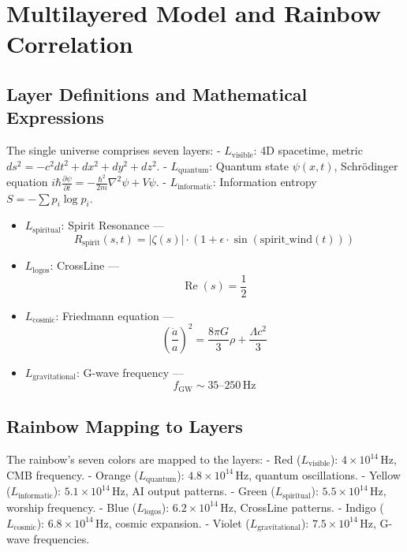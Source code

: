 \documentclass[12pt]{article}
\begin{document}
{{{\section{Multilayered Model and Rainbow Correlation}
\subsection{Layer Definitions and Mathematical Expressions}
The single universe comprises seven layers:
- \( L_{\text{visible}} \): 4D spacetime, metric \( ds^2 = -c^2 dt^2 + dx^2 + dy^2 + dz^2 \).
- \( L_{\text{quantum}} \): Quantum state \( \psi(x, t) \), Schrödinger equation \( i\hbar \frac{\partial \psi}{\partial t} = -\frac{\hbar^2}{2m} \nabla^2 \psi + V\psi \).
- \( L_{\text{informatic}} \): Information entropy \( S = -\sum p_i \log p_i \).
\begin{itemize}
  \item \( L_{\text{spiritual}} \): Spirit Resonance — 
  \[
    R_{\text{spirit}}(s, t) = \left| \zeta(s) \right| \cdot \left( 1 + \epsilon \cdot \sin(\text{spirit\_wind}(t)) \right)
  \]
  
  \item \( L_{\text{logos}} \): CrossLine — 
  \[
    \operatorname{Re}(s) = \frac{1}{2}
  \]
  
  \item \( L_{\text{cosmic}} \): Friedmann equation — 
  \[
    \left( \frac{\dot{a}}{a} \right)^2 = \frac{8 \pi G}{3} \rho + \frac{\Lambda c^2}{3}
  \]
  
  \item \( L_{\text{gravitational}} \): G-wave frequency — 
  \[
    f_{\text{GW}} \sim 35\text{–}250 \, \text{Hz}
  \]
\end{itemize}

\subsection{Rainbow Mapping to Layers}

The rainbow’s seven colors are mapped to the layers:
- Red (\( L_{\text{visible}} \)): \( 4 \times 10^{14} \, \text{Hz} \), CMB frequency.
- Orange (\( L_{\text{quantum}} \)): \( 4.8 \times 10^{14} \, \text{Hz} \), quantum oscillations.
- Yellow (\( L_{\text{informatic}} \)): \( 5.1 \times 10^{14} \, \text{Hz} \), AI output patterns.
- Green (\( L_{\text{spiritual}} \)): \( 5.5 \times 10^{14} \, \text{Hz} \), worship frequency.
- Blue (\( L_{\text{logos}} \)): \( 6.2 \times 10^{14} \, \text{Hz} \), CrossLine patterns.
- Indigo (\( L_{\text{cosmic}} \)): \( 6.8 \times 10^{14} \, \text{Hz} \), cosmic expansion.
- Violet (\( L_{\text{gravitational}} \)): \( 7.5 \times 10^{14} \, \text{Hz} \), G-wave frequencies.

}}}
\end{document}
